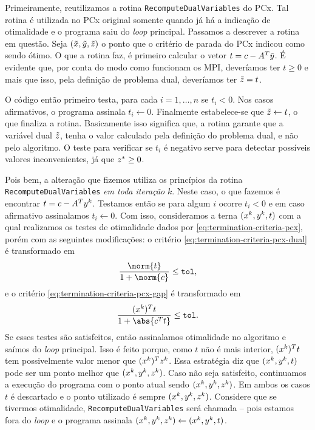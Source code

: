 Primeiramente,  reutilizamos a rotina \verb|RecomputeDualVariables| do PCx. Tal rotina  é utilizada no PCx original somente quando já há a indicação de otimalidade e o programa saiu do \emph{loop} principal. Passamos a descrever  a rotina em questão. Seja $(\tilde{x},\tilde{y},\tilde{z})$ o ponto que o critério de parada do PCx indicou como sendo ótimo. O que a rotina faz, é primeiro calcular o vetor  $t= c - A^T\tilde{y}$. É evidente que, por conta do modo como funcionam os \ac{MPI}, deveríamos ter $t\geq0$ e mais que isso, pela definição de problema dual, deveríamos ter $\tilde{z} = t$. 

 O código então primeiro testa, para cada  $i = 1,\ldots,n$ se $t_{i}<0$.  Nos casos afirmativos, o programa assinala $t_{i}\leftarrow 0$. Finalmente estabelece-se que  $\tilde{z} \leftarrow t $, o que finaliza a rotina. Basicamente isso significa que, a rotina garante que a variável dual $\tilde{z}$, tenha o valor calculado pela definição do problema dual, e não pelo algoritmo. O teste para verificar se $t_{i}$ é negativo serve para detectar possíveis valores inconvenientes, já que $z^*\geq 0$.

 Pois bem, a alteração que fizemos utiliza os princípios da rotina   \verb|RecomputeDualVariables| \emph{em toda iteração} $k$. Neste caso, o que fazemos é encontrar $t= c - A^Ty^{k}$. Testamos então se para algum  $i$ ocorre $t_{i}<0$ e em caso afirmativo assinalamos $t_{i}\leftarrow 0$. Com isso, consideramos a terna $(x^{k},y^{k},t)$ com a qual realizamos os testes de otimalidade dados por
 \eqref{eq:termination-criteria-pcx}, porém com as seguintes modificações: o critério \eqref{eq:termination-criteria-pcx-dual} é transformado em
\[\dfrac{\norm{t}}{1 + \norm{c}} \leq \tol,\]	
e o critério  \eqref{eq:termination-criteria-pcx-gap} é transformado em 
\[
	\dfrac{(\xk)^{T}t}{1 + \abs{c^Tt}}\leq\tol.
\]
Se esses testes são satisfeitos, então assinalamos otimalidade no algoritmo e saímos do \emph{loop} principal. 
Isso é feito porque,  como $t$ não é mais interior, $(x^{k})^{T}t$ tem possivelmente valor menor que $(x^{k})^{T}z^{k}$. Essa estratégia diz que $(x^{k},y^{k},t)$ pode ser um ponto melhor que $(x^{k},y^{k},z^{k})$.  Caso não seja satisfeito, continuamos a execução do programa com o ponto atual sendo $(x^{k},y^{k},z^{k})$. Em ambos os casos $t$ é descartado e o ponto utilizado é sempre $(x^{k},y^{k},z^{k})$. Considere que se tivermos otimalidade, \verb|RecomputeDualVariables| será chamada -- pois estamos fora do \emph{loop} e o programa assinala $(x^{k},y^{k},z^{k})\leftarrow (x^{k},y^{k},t)$. 

